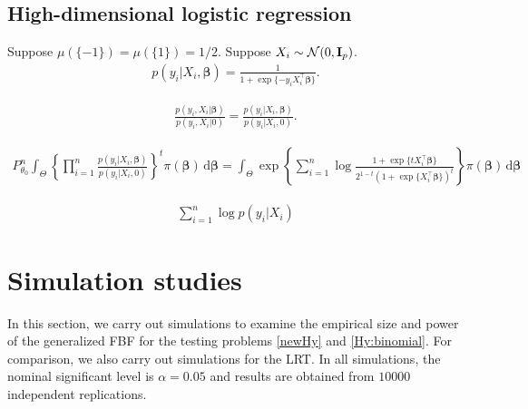 \documentclass[11pt]{article}
\newcommand{\myT}{\intercal}
\newcommand{\bfsym}[1]{\ensuremath{\boldsymbol{#1}}}
\def\bbeta{\bfsym \beta}
\theoremstyle{plain}
\theoremstyle{definition}
\theoremstyle{remark}
\begin{document}
\subsection{High-dimensional logistic regression}\label{sec:logistic}

Suppose $\mu(\{-1\}) = \mu(\{1\}) = 1/2 $.
Suppose $X_i \sim \mathcal N(0, \mathbf{I}_p)$.
\begin{align*}
    p(y_i | X_i, \bbeta )  =  \frac{1}{ 1 + \exp\{- y_i X_i^\myT \bbeta \} }.
\end{align*}

\begin{align*}
    \frac{p(y_i,  X_i | \bbeta)}{ p(y_i,  X_i | 0) }
    =
    \frac{p(y_i | X_i , \bbeta)}{ p(y_i|  X_i , 0) }.
\end{align*}

\begin{align*}
    P_{\theta_0}^n
    \int_{\Theta}
    \left\{
        \prod_{i=1}^n \frac{p(y_i|  X_i, \bbeta)}{ p(y_i|  X_i , 0) }
\right\}^t
\pi(\bbeta) \, \mathrm d \bbeta
    =
    \int_{\Theta}
    \exp\left\{
    \sum_{i=1}^n
    \log
\frac{
1 + \exp\{ t X_i^\myT \bbeta \} 
}{
    2^{1-t}
    \left(
1 + \exp\{ X_i^\myT \bbeta \} 
    \right)^t
}
\right\}
\pi(\bbeta) \, \mathrm d \bbeta
\end{align*}

\begin{align*}
    \sum_{i=1}^n \log p(y_i | X_i) 
\end{align*}



\section{Simulation studies} \label{sec:simu}
In this section, we carry out simulations to examine the empirical size and power of the generalized FBF for the testing problems \eqref{newHy} and \eqref{Hy:binomial}.
For comparison, we also carry out simulations for the LRT.
In all simulations, the nominal significant level is $\alpha = 0.05$ and results are obtained from $10000$ independent replications.
\end{document}
